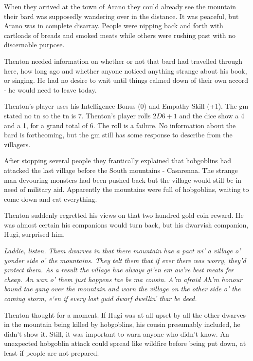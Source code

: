 \documentclass[titlepage,a4paper,openany]{book}
\begin{document}
\begin{multicols}{2}
\begin{exampletext}

When they arrived at the town of Arano they could already see the mountain their bard was supposedly wandering over in the distance. It was peaceful, but Arano was in complete disarray. People were nipping back and forth with cartloads of breads and smoked meats while others were rushing past with no discernable purpose.

Thenton needed information on whether or not that bard had travelled through here, how long ago and whether anyone noticed anything strange about his book, or singing. He had no desire to wait until things calmed down of their own accord - he would need to leave today.

Thenton's player uses his Intelligence Bonus (0) and Empathy Skill (+1).
The \gls{gm} stated no \gls{tn} so the \gls{tn} is 7.
Thenton's player rolls $2D6+1$ and the dice show a 4 and a 1, for a grand total of 6.
The roll is a failure.
No information about the bard is forthcoming, but the \gls{gm} still has some response to describe from the villagers.

After stopping several people they frantically explained that hobgoblins had attacked the last village before the South mountains - Casarenna.
The strange man-devouring monsters had been pushed back but the village would still be in need of military aid.
Apparently the mountains were full of hobgoblins, waiting to come down and eat everything.

Thenton suddenly regretted his views on that two hundred gold coin reward. He was almost certain his companions would turn back, but his dwarvish companion, Hugi, surprised him.

	\emph{Laddie, listen. Them dwarves in that there mountain hae a pact wi' a village o' yonder side o' the mountains. They telt them that if ever there was worry, they'd protect them. As a result the village hae always gi'en em aw're best meats fer cheap. An wan o' them just happens tae be ma cousin. A'm afraid Ah'm honour bound tae gang over the mountain and warn the village on the other side o' the coming storm, e`en if every last guid dwarf dwellin' thar be deed.}

Thenton thought for a moment. If Hugi was at all upset by all the other dwarves in the mountain being killed by hobgoblins, his cousin presumably included, he didn't show it.
Still, it was important to warn anyone who didn't know.
An unexpected hobgoblin attack could spread like wildfire before being put down, at least if people are not prepared.


\end{exampletext}
\end{multicols}
\end{document}
